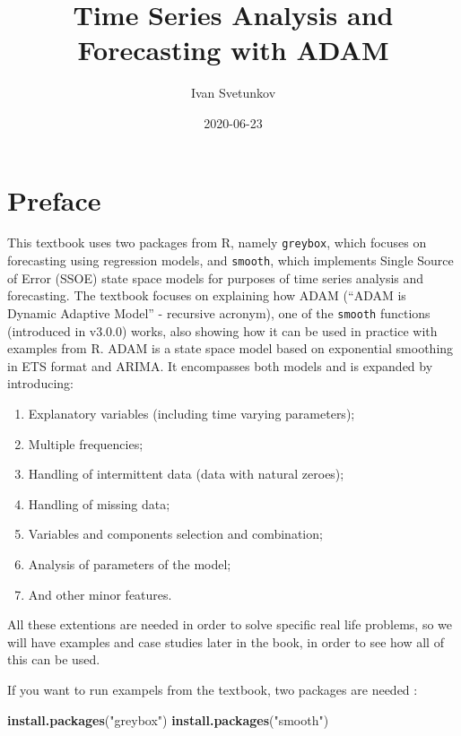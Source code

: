 \documentclass[]{book}
\title{Time Series Analysis and Forecasting with ADAM}
\author{Ivan Svetunkov}
\date{2020-06-23}
\newenvironment{Shaded}{\begin{snugshade}}{\end{snugshade}}
\newcommand{\KeywordTok}[1]{\textcolor[rgb]{0.13,0.29,0.53}{\textbf{#1}}}
\newcommand{\NormalTok}[1]{#1}
\newcommand{\StringTok}[1]{\textcolor[rgb]{0.31,0.60,0.02}{#1}}
\providecommand{\tightlist}{%
  \setlength{\itemsep}{0pt}\setlength{\parskip}{0pt}}
\begin{document}
\maketitle

{
\setcounter{tocdepth}{1}
\tableofcontents
}
\hypertarget{preface}{%
\chapter*{Preface}\label{preface}}

This textbook uses two packages from R, namely \texttt{greybox}, which focuses on forecasting using regression models, and \texttt{smooth}, which implements Single Source of Error (SSOE) state space models for purposes of time series analysis and forecasting. The textbook focuses on explaining how ADAM (``ADAM is Dynamic Adaptive Model'' - recursive acronym), one of the \texttt{smooth} functions (introduced in v3.0.0) works, also showing how it can be used in practice with examples from R. ADAM is a state space model based on exponential smoothing in ETS format and ARIMA. It encompasses both models and is expanded by introducing:

\begin{enumerate}
\def\labelenumi{\arabic{enumi}.}
\tightlist
\item
  Explanatory variables (including time varying parameters);
\item
  Multiple frequencies;
\item
  Handling of intermittent data (data with natural zeroes);
\item
  Handling of missing data;
\item
  Variables and components selection and combination;
\item
  Analysis of parameters of the model;
\item
  And other minor features.
\end{enumerate}

All these extentions are needed in order to solve specific real life problems, so we will have examples and case studies later in the book, in order to see how all of this can be used.

If you want to run exampels from the textbook, two packages are needed \citep{R-greybox, R-smooth}:

\begin{Shaded}
\begin{Highlighting}[]
\KeywordTok{install.packages}\NormalTok{(}\StringTok{"greybox"}\NormalTok{)}
\KeywordTok{install.packages}\NormalTok{(}\StringTok{"smooth"}\NormalTok{)}
\end{Highlighting}
\end{Shaded}
\end{document}
